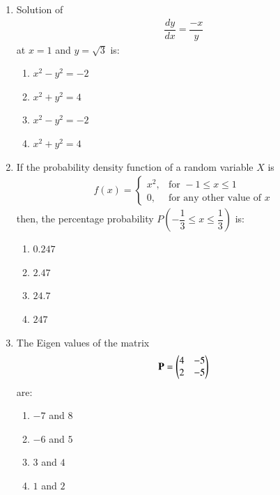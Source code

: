 \documentclass[journal]{IEEEtran}
\begin{document}
\begin{enumerate}
\item Solution of \begin{align} \dfrac{dy}{dx} = \dfrac{-x}{y} \end{align}at $x = 1$ and $y = \sqrt{3}$ is: \textbf{}
\begin{multicols}{2}
\begin{enumerate}
\item $x^2 - y^2 = -2$
\item $x^2 + y^2 = 4$
\item $x^2 - y^2 = -2$
\item $x^2 + y^2 = 4$
\end{enumerate}
\end{multicols}

\item If the probability density function of a random variable $X$ is  
\begin{align}
f(x) = 
\begin{cases}
x^2, & \text{for } -1 \leq x \leq 1 \\
0, & \text{for any other value of } x
\end{cases}
\end{align}
then, the percentage probability $P\left( -\dfrac{1}{3} \leq x \leq \dfrac{1}{3} \right)$ is: \textbf{}
\begin{multicols}{2}
\begin{enumerate}
\item $0.247$
\item $2.47$
\item $24.7$
\item $247$
\end{enumerate}
\end{multicols}

\item The Eigen values of the matrix \textbf{}
\begin{align}
\mathbf{P} = \begin{pmatrix}4 & -5 \\ 2 & -5\end{pmatrix}
\end{align}
are:
\begin{multicols}{2}
\begin{enumerate}
\item $-7$ and $8$
\item $-6$ and $5$
\item $3$ and $4$
\item $1$ and $2$
\end{enumerate}
\end{multicols}


\end{enumerate}
\end{document}

